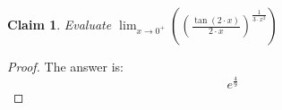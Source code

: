 \documentclass{article}
\newtheorem{theorem}{Claim}
\begin{document}
\begin{theorem}
Evaluate
$ \lim_{x \to 0^{+}} \left( \left( \frac{ \tan(2 \cdot x) }{ 2 \cdot x } \right)^{\frac{ 1 }{ 3 \cdot x^2 }} \right) $
\end{theorem}

\begin{proof}
The answer is:
\[
e^{\frac{4}{9}}
\]
\end{proof}
\end{document}
